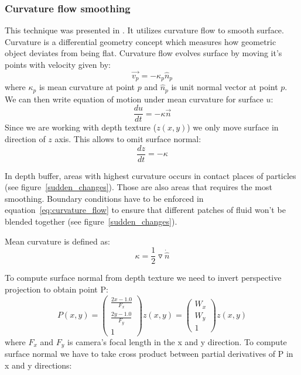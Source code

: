 \subsubsection{Curvature flow smoothing} \label{sec:curvatureflowsmoothing}
This technique was presented in \cite{laanSainz2009}. It utilizes curvature flow to smooth surface. Curvature is a differential geometry concept which measures how geometric object deviates from being flat. Curvature flow evolves surface by moving it's points with velocity given by:
\begin{equation}
\vec{v_p} = -\kappa_p \hat{n}_p
\end{equation}
where $\kappa_p$ is mean curvature at point $p$ and $\hat{n}_p$ is unit normal vector at point $p$.
We can then write equation of motion under mean curvature for surface $u$:
\begin{equation}
\label{eq:curvature_flow}
\frac{du}{dt} = -\kappa \vec{n}
\end{equation}
Since we are working with depth texture ($z(x, y)$) we only move surface in direction of $z$ axis. This allows to omit surface normal:
\begin{equation}
\label{eq:curvature_flow_z}
\frac{dz}{dt} = -\kappa
\end{equation}

In depth buffer, areas with highest curvature occurs in contact places of particles (see figure~\ref{sudden_changes}). Those are also areas that requires the most smoothing. Boundary conditions have to be enforced in equation~\ref{eq:curvature_flow} to ensure that different patches of fluid won't be blended together (see figure~\ref{sudden_changes}).


Mean curvature is defined as:
\begin{equation} \label{eq:mean_curvature}
\kappa = \frac{1}{2} \triangledown \dot \hat{n}
\end{equation}

To compute surface normal from depth texture we need to invert perspective projection to obtain point P:
\begin{equation}
P(x, y) = 
\begin{pmatrix}
\frac{2x -1.0}{F_x} \\
\frac{2y -1.0}{F_y} \\
1
\end{pmatrix}
z(x,y) = 
\begin{pmatrix}
W_x \\
W_y \\
1
\end{pmatrix} z(x,y)
\end{equation}
where $F_x$ and $F_y$ is camera's focal length in the x and y direction. To compute surface normal we have to take cross product between partial derivatives of P in x and y directions:

